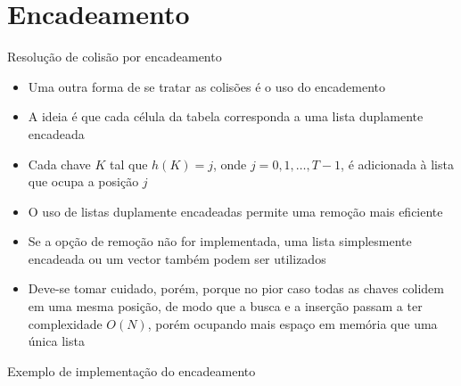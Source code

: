\section{Encadeamento}

\begin{frame}[fragile]{Resolução de colisão por encadeamento}

    \begin{itemize}
        \item Uma outra forma de se tratar as colisões é o uso do encademento

        \item A ideia é que cada célula da tabela corresponda a uma lista duplamente encadeada

        \item Cada chave $K$ tal que $h(K) = j$, onde $j = 0, 1, \ldots, T - 1$, é adicionada
            à lista que ocupa a posição $j$

        \item O uso de listas duplamente encadeadas permite uma remoção mais eficiente

        \item Se a opção de remoção não for implementada, uma lista simplesmente encadeada ou
            um vector também podem ser utilizados

        \item Deve-se tomar cuidado, porém, porque no pior caso todas as chaves colidem em
            uma mesma posição, de modo que a busca e a inserção passam a ter complexidade
            $O(N)$, porém ocupando mais espaço em memória que uma única lista
    \end{itemize}

\end{frame}



\begin{frame}[fragile]{Exemplo de implementação do encadeamento}
\end{frame}
